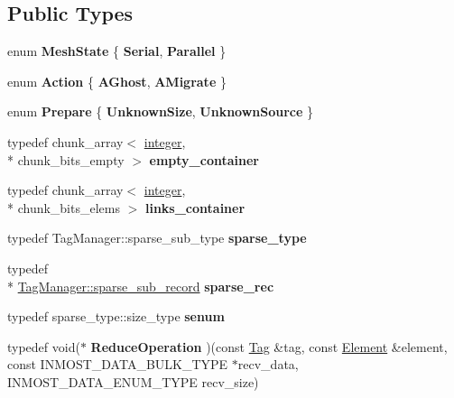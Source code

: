 \subsection*{Public Types}
\begin{DoxyCompactItemize}
\item 
enum {\bfseries Mesh\-State} \{ {\bfseries Serial}, 
{\bfseries Parallel}
 \}
\item 
enum {\bfseries Action} \{ {\bfseries A\-Ghost}, 
{\bfseries A\-Migrate}
 \}
\item 
enum {\bfseries Prepare} \{ {\bfseries Unknown\-Size}, 
{\bfseries Unknown\-Source}
 \}
\item 
\hypertarget{classINMOST_1_1Mesh_ae9055f423fc6502c7e476ce1247904e6}{typedef chunk\-\_\-array$<$ \hyperlink{classINMOST_1_1Storage_aec96942bc647417a801e2895b45964d2}{integer}, \\*
chunk\-\_\-bits\-\_\-empty $>$ {\bfseries empty\-\_\-container}}\label{classINMOST_1_1Mesh_ae9055f423fc6502c7e476ce1247904e6}

\item 
\hypertarget{classINMOST_1_1Mesh_a7a8e9f6b0b8eea367c332c36320d4c02}{typedef chunk\-\_\-array$<$ \hyperlink{classINMOST_1_1Storage_aec96942bc647417a801e2895b45964d2}{integer}, \\*
chunk\-\_\-bits\-\_\-elems $>$ {\bfseries links\-\_\-container}}\label{classINMOST_1_1Mesh_a7a8e9f6b0b8eea367c332c36320d4c02}

\item 
\hypertarget{classINMOST_1_1Mesh_a7aa5359ad0ee39a9a35ed7230d8bd3e1}{typedef Tag\-Manager\-::sparse\-\_\-sub\-\_\-type {\bfseries sparse\-\_\-type}}\label{classINMOST_1_1Mesh_a7aa5359ad0ee39a9a35ed7230d8bd3e1}

\item 
\hypertarget{classINMOST_1_1Mesh_a108a6bf9c3b9ce9d446c891a23329ef1}{typedef \\*
\hyperlink{structINMOST_1_1TagManager_1_1sparse__sub__record}{Tag\-Manager\-::sparse\-\_\-sub\-\_\-record} {\bfseries sparse\-\_\-rec}}\label{classINMOST_1_1Mesh_a108a6bf9c3b9ce9d446c891a23329ef1}

\item 
\hypertarget{classINMOST_1_1Mesh_aa32a7de3dbfafd84c6635212b20aecb7}{typedef sparse\-\_\-type\-::size\-\_\-type {\bfseries senum}}\label{classINMOST_1_1Mesh_aa32a7de3dbfafd84c6635212b20aecb7}

\item 
\hypertarget{classINMOST_1_1Mesh_a06b71cc969ef0d9f4e87e51febbfec3b}{typedef void($\ast$ {\bfseries Reduce\-Operation} )(const \hyperlink{classINMOST_1_1Tag}{Tag} \&tag, const \hyperlink{classINMOST_1_1Element}{Element} \&element, const I\-N\-M\-O\-S\-T\-\_\-\-D\-A\-T\-A\-\_\-\-B\-U\-L\-K\-\_\-\-T\-Y\-P\-E $\ast$recv\-\_\-data, I\-N\-M\-O\-S\-T\-\_\-\-D\-A\-T\-A\-\_\-\-E\-N\-U\-M\-\_\-\-T\-Y\-P\-E recv\-\_\-size)}\label{classINMOST_1_1Mesh_a06b71cc969ef0d9f4e87e51febbfec3b}


\end{DoxyCompactItemize}
